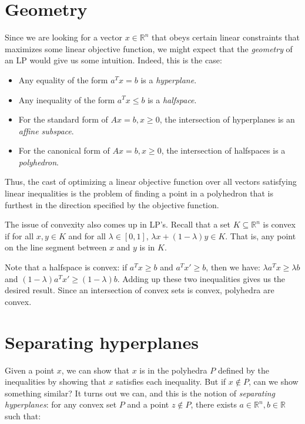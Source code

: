 \documentclass{article}
\newcommand{\reals}{\mathbb{R}}
\begin{document}
\section{Geometry}

Since we are looking for a vector $x \in \reals^n$ that obeys certain
linear constraints that maximizes some linear objective function, we
might expect that the \emph{geometry} of an LP would give us some
intuition.  Indeed, this is the case:

\begin{itemize}
\item Any equality of the form $a^T x = b$ is a \emph{hyperplane}.
\item Any inequality of the form $a^T x \leq b$ is a \emph{halfspace}.
\item For the standard form of $Ax = b, x\geq 0$, the intersection of 
  hyperplanes is an \emph{affine subspace}.
\item For the canonical form of $Ax = b, x \geq 0$, the intersection
  of halfspaces is a \emph{polyhedron}.
\end{itemize}

Thus, the cast of optimizing a linear objective function over all
vectors satisfying linear inequalities is the problem of finding a
point in a polyhedron that is furthest in the direction specified by
the objective function.

The issue of convexity also comes up in LP's.  Recall that a set $K
\subseteq \reals^n$ is convex if for all $x,y \in K$ and for all
$\lambda \in [0,1]$, $\lambda x + (1-\lambda) y \in K$.  That is, any
point on the line segment between $x$ and $y$ is in $K$.

Note that a halfspace is convex: if $a^T x \geq b$ and $a^T x' \geq
b$, then we have: $\lambda a^T x \geq \lambda b$ and $(1-\lambda)a^T
x' \geq (1-\lambda)b$.  Adding up these two inequalities gives us the
desired result.  Since an intersection of convex sets is convex,
polyhedra are convex.

\section{Separating hyperplanes}

Given a point $x$, we can show that $x$ is in the polyhedra $P$
defined by the inequalities by showing that $x$ satisfies each
inequality.  But if $x \notin P$, can we show something similar?  It
turns out we can, and this is the notion of \emph{separating
  hyperplanes}: for any convex set $P$ and a point $z \notin P$, there
exists $a \in \reals^n, b \in \reals$ such that:
\end{document}
